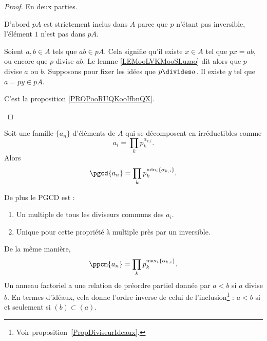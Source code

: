 \begin{proof}
	En deux parties.
	\begin{subproof}
		D'abord \( pA\) est strictement inclus dans \( A\) parce que \( p\) n'étant pas inversible, l'élément \( 1\) n'est pas dans \( pA\).

		Soient \( a,b\in A\) tels que \( ab\in pA\). Cela signifie qu'il existe \( x\in A\) tel que \( px=ab\), ou encore que \( p\) divise \( ab\). Le lemme \ref{LEMooLVKMooSLuzao} dit alors que \( p\) divise \( a\) ou \( b\). Supposons pour fixer les idées que \( p\divides a\). Il existe \( y\) tel que \( a=py\in pA\).

		C'est la proposition \ref{PROPooRUQKooIfbnQX}.
	\end{subproof}
\end{proof}

\begin{proposition}		\label{PROPooOXQMooVEzlyG}
	Soit une famille \( \{ a_n \}\) d'éléments de \( A\) qui se décomposent en irréductibles comme
	\begin{equation}
		a_i=\prod_k p_k^{\alpha_{k,i}}.
	\end{equation}
	Alors
	\begin{equation}
		\pgcd\{ a_n \}=\prod_k p_k^{\min_i\{ \alpha_{k,i} \}}.
	\end{equation}

	De plus le PGCD est :
	\begin{enumerate}
		\item
		      Un multiple de tous les diviseurs communs des \( a_i\).
		\item
		      Unique pour cette propriété à multiple près par un inversible.
	\end{enumerate}
\end{proposition}

De la même manière,
\begin{equation}
	\ppcm\{ a_n \}=\prod_kp_k^{\max_i\{ \alpha_{k,i} \}}.
\end{equation}
Un anneau factoriel a une relation de préordre partiel donnée par \( a<b\) si \( a\) divise \( b\). En termes d'idéaux, cela donne l'ordre inverse de celui de l'inclusion\footnote{Voir proposition~\ref{PropDiviseurIdeaux}.} : \( a<b\) si et seulement si \( (b)\subset (a)\).


